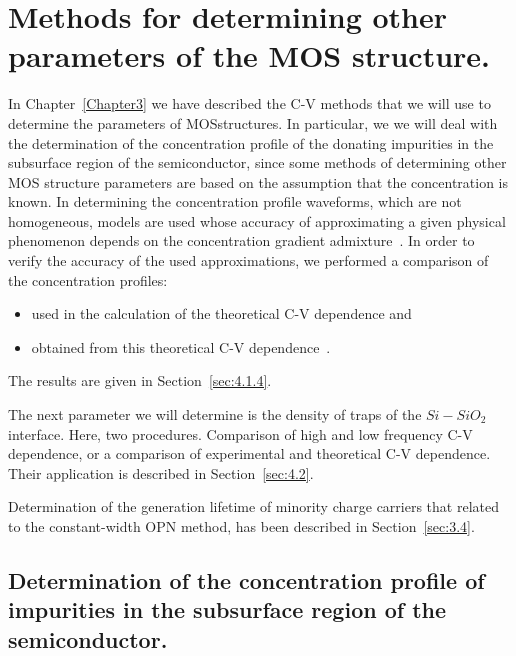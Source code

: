 
\chapter{Methods for determining other parameters of the MOS structure.}\label{Chapter4}

In Chapter~\ref{Chapter3} we have described the C-V methods that we
will use to determine the parameters of MOS\@ structures. In
particular, we we will deal with the determination of the
concentration profile of the donating impurities in the subsurface
region of the semiconductor, since some methods of determining other
MOS structure parameters are based on the assumption that the
concentration is known. In determining the concentration profile
waveforms, which are not homogeneous, models are used whose accuracy
of approximating a given physical phenomenon depends on the
concentration gradient admixture~\cite{4.1, 4.2, 4.3, 4.4}. In order
to verify the accuracy of the used approximations, we performed a
comparison of the concentration profiles:

\begin{itemize}
\item used in the calculation of the theoretical C-V dependence and
\item obtained from this theoretical C-V dependence~\cite{4.5}.
\end{itemize}

The results are given in Section~\ref{sec:4.1.4}.

\par The next parameter we will determine is the density of traps
of the $Si-SiO_{2}$ interface. Here, two
procedures. Comparison of high and low frequency C-V
dependence, or a comparison of experimental and theoretical C-V
dependence. Their application is described in Section~\ref{sec:4.2}.

\par Determination of the generation lifetime of minority charge carriers that
related to the constant-width OPN method, has been described in Section~\ref{sec:3.4}.

\section[Determination of the concentration profile of impurities]{Determination of the concentration profile of impurities in the subsurface region of the semiconductor.}\label{sec:4.1}

